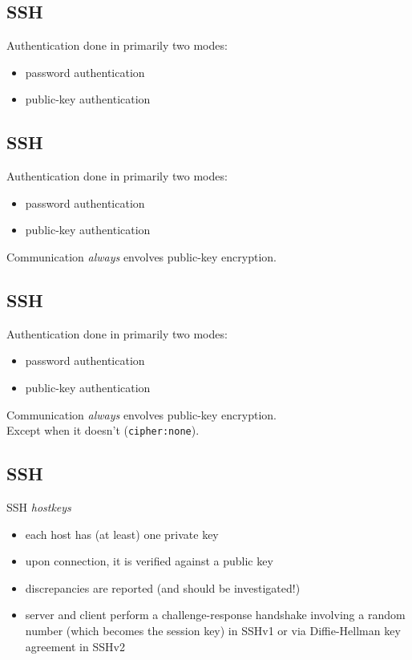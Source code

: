 \documentclass[xga]{xdvislides}
\begin{document}
\subsection{SSH}
Authentication done in primarily two modes:
\begin{itemize}
	\item password authentication
	\item public-key authentication
\end{itemize}

\subsection{SSH}
Authentication done in primarily two modes:
\begin{itemize}
	\item password authentication
	\item public-key authentication
\end{itemize}
\vspace{.2in}
Communication {\em always} envolves public-key encryption.

\subsection{SSH}
Authentication done in primarily two modes:
\begin{itemize}
	\item password authentication
	\item public-key authentication
\end{itemize}
\vspace{.2in}
Communication {\em always} envolves public-key encryption.
\\

Except when it doesn't (\verb+cipher:none+).

\subsection{SSH}
SSH {\em hostkeys}
\begin{itemize}
	\item each host has (at least) one private key
	\item upon connection, it is verified against a public key
	\item discrepancies are reported (and should be investigated!)
	\item server and client perform a challenge-response handshake involving a
		random number (which becomes the session key) in SSHv1 or via
		Diffie-Hellman key agreement in SSHv2
\end{itemize}
\end{document}
